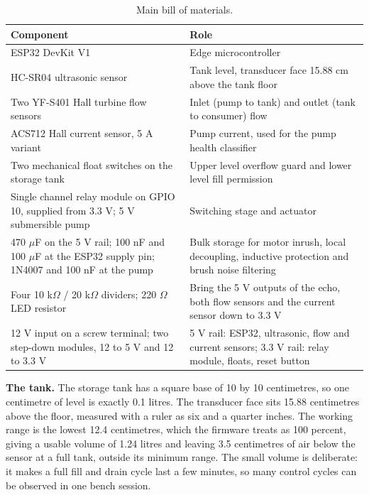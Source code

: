\begin{table}[H]
\caption{Main bill of materials.}
\label{tab:bom}
\centering
\renewcommand{\arraystretch}{1.1}
\begin{tabular}{|p{5.2cm}|p{7.8cm}|}
\hline
\textbf{Component} & \textbf{Role} \\
\hline
ESP32 DevKit V1 & Edge microcontroller \\
\hline
HC-SR04 ultrasonic sensor & Tank level, transducer face 15.88 cm above the tank floor \\
\hline
Two YF-S401 Hall turbine flow sensors & Inlet (pump to tank) and outlet (tank to consumer) flow \\
\hline
ACS712 Hall current sensor, 5 A variant & Pump current, used for the pump health classifier \\
\hline
Two mechanical float switches on the storage tank & Upper level overflow guard and lower level fill permission \\
\hline
Single channel relay module on GPIO 10, supplied from 3.3 V; 5 V submersible pump & Switching stage and actuator \\
\hline
470 $\mu$F on the 5 V rail; 100 nF and 100 $\mu$F at the ESP32 supply pin; 1N4007 and 100 nF at the pump & Bulk storage for motor inrush, local decoupling, inductive protection and brush noise filtering \\
\hline
Four 10 k$\Omega$ / 20 k$\Omega$ dividers; 220 $\Omega$ LED resistor & Bring the 5 V outputs of the echo, both flow sensors and the current sensor down to 3.3 V \\
\hline
12 V input on a screw terminal; two step-down modules, 12 to 5 V and 12 to 3.3 V & 5 V rail: ESP32, ultrasonic, flow and current sensors; 3.3 V rail: relay module, floats, reset button \\
\hline
\end{tabular}
\end{table}

\textbf{The tank.} The storage tank has a square base of 10 by 10 centimetres, so one centimetre of level is exactly 0.1 litres. The transducer face sits 15.88 centimetres above the floor, measured with a ruler as six and a quarter inches. The working range is the lowest 12.4 centimetres, which the firmware treats as 100 percent, giving a usable volume of 1.24 litres and leaving 3.5 centimetres of air below the sensor at a full tank, outside its minimum range. The small volume is deliberate: it makes a full fill and drain cycle last a few minutes, so many control cycles can be observed in one bench session.


